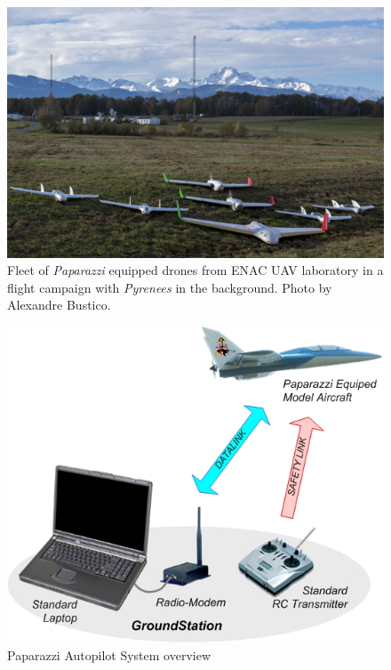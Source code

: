 \begin{figure}[!hbt]
\begin{center}
\includegraphics[width=13.3cm]{figures/ENACdroneFleet}
\caption{Fleet of \emph{Paparazzi} equipped drones from ENAC UAV laboratory in a flight campaign with \emph{Pyrenees} in the background. Photo by Alexandre Bustico.} 
\label{fig:ENACdroneFleet}
\end{center}
\end{figure}


\begin{figure}[!hbt]
\begin{center}
\includegraphics[width=11.3cm]{figures/Paparazzi_System_overview}
\caption{Paparazzi Autopilot System overview} 
\label{fig:Paparazzi_System_overview}
\end{center}
\end{figure}


